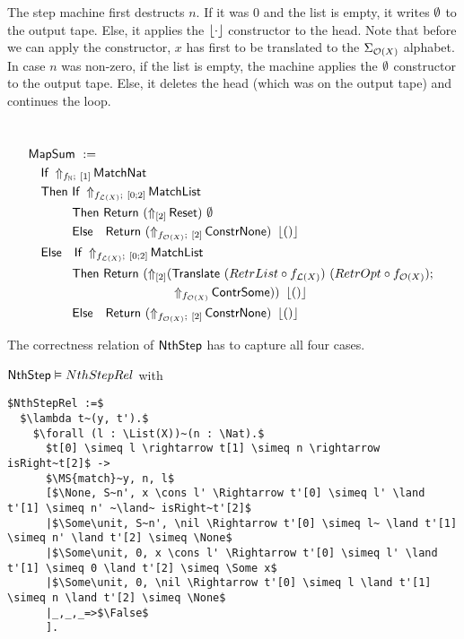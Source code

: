 The step machine first destructs $n$.  If it was $0$ and the list is empty, it writes $\emptyset$ to the output tape.  Else, it applies the $\left\lfloor {\cdot} \right\rfloor$
constructor to the head.  Note that before we can apply the constructor, $x$ has first to be translated to the $\Sigma_{\mathcal{O}(X)}$ alphabet.  In
case $n$ was non-zero, if the list is empty, the machine applies the $\emptyset$ constructor to the output tape.  Else, it deletes the head (which was on
the output tape) and continues the loop.

\begin{definition}[$\MS{NthStep}$]
  \label{def:Nth_Step}
  ~
  \begin{align*}
    & \MS{MapSum}~:= \\
    &\quad \MS{If}~\LiftBoth{\MS{MatchNat}}{f_\Nat}{\Vector{1}} \\
    &\quad \MS{Then}~ \MS{If}~\LiftBoth{\MS{MatchList}}{f_{\List(X)}}{\Vector{0;2}} \\
    &\quad \phantom{\MS{Then}}~\MS{Then}~   \Return{(\LiftTapes{\MS{Reset}}{\Vector{2}})}{\None} \\
    &\quad \phantom{\MS{Then}}~\MS{Else}~~~ \Return{(\LiftBoth{\MS{ConstrNone}}{f_{\Option(X)}}{\Vector{2}})}{\Some\unit} \\
    &\quad \MS{Else}~~~ \MS{If}~\LiftBoth{\MS{MatchList}}{f_{\List(X)}}{\Vector{0;2}} \\
    &\quad \phantom{\MS{Then}}~\MS{Then}~   \Return{(\LiftTapes{(\MS{Translate}~(RetrList \circ f_{\List(X)})~(RetrOpt \circ f_{\Option(X)}) \Seq \\
    &\quad \phantom{\phantom{\MS{Then}}~\MS{Then}~\MS{Return}}\quad\quad~~ \LiftAlphabet{\MS{ContrSome}}{f_{\Option(X)}})}{\Vector{2}})}{\Some\unit} \\
    &\quad \phantom{\MS{Then}}~\MS{Else}~~~ \Return{(\LiftBoth{\MS{ConstrNone}}{f_{\Option(X)}}{\Vector{2}})}{\Some\unit}
  \end{align*}
\end{definition}

The correctness relation of $\MS{NthStep}$ has to capture all four cases.

\begin{lemma}
  \label{lem:Nth_Step_Realise}
  $\mathsf{NthStep} \mathrel{\vDash} NthStepRel$ with
  \small
\begin{lstlisting}[style=semicoqstyle]
$NthStepRel :=$
  $\lambda t~(y, t').$
    $\forall (l : \List(X))~(n : \Nat).$
      $t[0] \simeq l \rightarrow t[1] \simeq n \rightarrow isRight~t[2]$ ->
      $\MS{match}~y, n, l$
      [$\None, S~n', x \cons l' \Rightarrow t'[0] \simeq l' \land t'[1] \simeq n' ~\land~ isRight~t'[2]$
      |$\Some\unit, S~n', \nil \Rightarrow t'[0] \simeq l~ \land t'[1] \simeq n' \land t'[2] \simeq \None$
      |$\Some\unit, 0, x \cons l' \Rightarrow t'[0] \simeq l' \land t'[1] \simeq 0 \land t'[2] \simeq \Some x$
      |$\Some\unit, 0, \nil \Rightarrow t'[0] \simeq l \land t'[1] \simeq n \land t'[2] \simeq \None$
      |_,_,_=>$\False$
      ].
\end{lstlisting}
\end{lemma}

